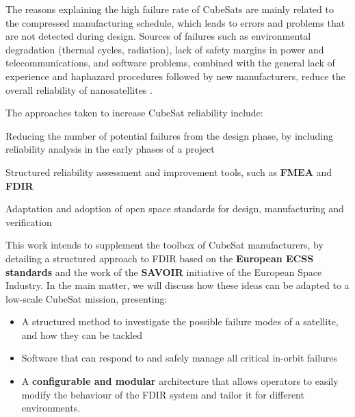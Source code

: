\documentclass[a4paper,nobib,final]{tufte-book}
\begin{document}
The reasons explaining the high failure rate of CubeSats are mainly related to the compressed manufacturing schedule, which leads to errors and problems that are not detected during design. Sources of failures such as environmental degradation (thermal cycles, radiation), lack of safety margins in power and telecommunications, and software problems, combined with the general lack of experience and haphazard procedures followed by new manufacturers, reduce the overall reliability of nanosatellites \autocite{swartwout_cubesat_mission_2019,langer_reliability_estimation_2017}.

The approaches taken to increase CubeSat reliability include:
\begin{compactitem}
	\item Reducing the number of potential failures from the design phase, by including reliability analysis in the early phases of a project
	\item Structured reliability assessment and improvement tools, such as \textbf{\acf{FMEA}} and \textbf{\acf{FDIR}} \autocite{faure_lean_satellites_2017,menchinelli_reliability_engineering_2018}
	\item Adaptation and adoption of open space standards for design, manufacturing and verification
\end{compactitem}


This work intends to supplement the toolbox of CubeSat manufacturers, by detailing a structured approach to \ac{FDIR} based on the \textbf{European \acs{ECSS} standards} and the work of the \textbf{\acs{SAVOIR}} initiative of the European Space Industry. In the main matter, we will discuss how these ideas can be adapted to a low-scale CubeSat mission, presenting:
\begin{itemize}
	\item A structured method to investigate the possible failure modes of a satellite, and how they can be tackled
	\item Software that can respond to and safely manage all critical in-orbit failures
	\item A \textbf{configurable and modular} architecture that allows operators to easily modify the behaviour of the \acs{FDIR} system and tailor it for different environments.
\end{itemize}
\end{document}
